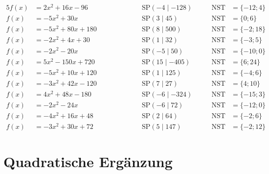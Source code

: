 \documentclass
[
  draft    = true,
  fontsize = 11pt,
  parskip  = half-,
  BCOR     = 0pt,
  DIV      = 11
]
{scrartcl}
\begin{document}
\begin{alignat*}{5}
  f(x)&=2x^{2}+16x-96 \qquad&\qquad \quad&\text{SP}(-4\mid-128) \quad&\quad \text{NST}&=\{-12;4\} \\[0.5ex]
  f(x)&=-5x^{2}+30x \qquad&\qquad \quad&\text{SP}(3\mid45) \quad&\quad \text{NST}&=\{0;6\} \\[0.5ex]
  f(x)&=-5x^{2}+80x+180 \qquad&\qquad \quad&\text{SP}(8\mid500) \quad&\quad \text{NST}&=\{-2;18\} \\[0.5ex]
  f(x)&=-2x^{2}+4x+30 \qquad&\qquad \quad&\text{SP}(1\mid32) \quad&\quad \text{NST}&=\{-3;5\} \\[0.5ex]
  f(x)&=-2x^{2}-20x \qquad&\qquad \quad&\text{SP}(-5\mid50) \quad&\quad \text{NST}&=\{-10;0\} \\[0.5ex]
  f(x)&=5x^{2}-150x+720 \qquad&\qquad \quad&\text{SP}(15\mid-405) \quad&\quad \text{NST}&=\{6;24\} \\[0.5ex]
  f(x)&=-5x^{2}+10x+120 \qquad&\qquad \quad&\text{SP}(1\mid125) \quad&\quad \text{NST}&=\{-4;6\} \\[0.5ex]
  f(x)&=-3x^{2}+42x-120 \qquad&\qquad \quad&\text{SP}(7\mid27) \quad&\quad \text{NST}&=\{4;10\} \\[0.5ex]
  f(x)&=4x^{2}+48x-180 \qquad&\qquad \quad&\text{SP}(-6\mid-324) \quad&\quad \text{NST}&=\{-15;3\} \\[0.5ex]
  f(x)&=-2x^{2}-24x \qquad&\qquad \quad&\text{SP}(-6\mid72) \quad&\quad \text{NST}&=\{-12;0\} \\[0.5ex]
  f(x)&=-4x^{2}+16x+48 \qquad&\qquad \quad&\text{SP}(2\mid64) \quad&\quad \text{NST}&=\{-2;6\} \\[0.5ex]
  f(x)&=-3x^{2}+30x+72 \qquad&\qquad \quad&\text{SP}(5\mid147) \quad&\quad \text{NST}&=\{-2;12\}
\end{alignat*}

\clearpage
\section*{Quadratische Ergänzung}
\end{document}
